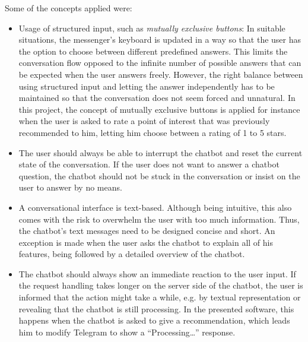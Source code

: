 Some of the concepts applied were:
\begin{itemize}
\item Usage of structured input, such as \textit{mutually exclusive buttons}: In suitable situations, the messenger’s keyboard is updated in a way so that the user has the option to choose between different predefined answers. This limits the conversation flow opposed to the infinite number of possible answers that can be expected when the user answers freely. However, the right balance between using structured input and letting the answer independently has to be maintained so that the conversation does not seem forced and unnatural. In this project, the concept of mutually exclusive buttons is applied for instance when the user is asked to rate a point of interest that was previously recommended to him, letting him choose between a rating of 1 to 5 stars.

\item The user should always be able to interrupt the chatbot and reset the current state of the conversation. If the user does not want to answer a chatbot question, the chatbot should not be stuck in the conversation or insist on the user to answer by no means.

\item A conversational interface is text-based. Although being intuitive, this also comes with the risk to overwhelm the user with too much information. Thus, the chatbot’s text messages need to be designed concise and short. An exception is made when the user asks the chatbot to explain all of his features, being followed by a detailed overview of the chatbot.

\item The chatbot should always show an immediate reaction to the user input. If the request handling takes longer on the server side of the chatbot, the user is informed that the action might take a while, e.g. by textual representation or revealing that the chatbot is still processing. In the presented software, this happens when the chatbot is asked to give a recommendation, which leads him to modify Telegram to show a “Processing…” response. 
\end{itemize} 

